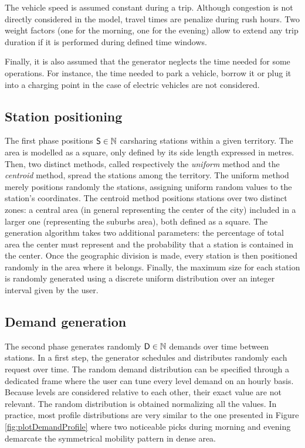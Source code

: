 \medskip
The vehicle speed is assumed constant during a trip.
Although congestion is not directly considered in the model, travel times are penalize during rush hours.
Two weight factors (one for the morning, one for the evening) allow to extend any trip duration if it is performed during defined time windows.

\medskip
Finally, it is also assumed that the generator neglects the time needed for some operations.
For instance, the time needed to park a vehicle, borrow it or plug it into a charging point in the case of electric vehicles are not considered.


\subsection{Station positioning}
The first phase positions $\mathsf{S} \in \mathbb{N}$ carsharing stations within a given territory.
The area is modelled as a square, only defined by its side length expressed in metres.
Then, two distinct methods, called respectively the \emph{uniform} method and the \emph{centroid} method, spread the stations among the territory.
The uniform method merely positions randomly the stations, assigning uniform random values to the station's coordinates.
The centroid method positions stations over two distinct zones: a central area (in general representing the center of the city) included in a larger one (representing the suburbs area), both defined as a square.
The generation algorithm takes two additional parameters: the percentage of total area the center must represent and the probability that a station is contained in the center.
Once the geographic division is made, every station is then positioned randomly in the area where it belongs. 
Finally, the maximum size for each station is randomly generated using a discrete uniform distribution over an integer interval given by the user. %


\subsection{Demand generation}
The second phase generates randomly $\mathsf{D} \in \mathbb{N}$ demands over time between stations.
In a first step, the generator schedules and distributes randomly each request over time.
The random demand distribution can be specified through a dedicated frame where the user can tune every level demand on an hourly basis.
Because levels are considered relative to each other, their exact value are not relevant.
The random distribution is obtained normalizing all the values. %
In practice, most profile distributions are very similar to the one presented in Figure \ref{fig:plotDemandProfile} where two noticeable picks during morning and evening demarcate the symmetrical mobility pattern in dense area.

